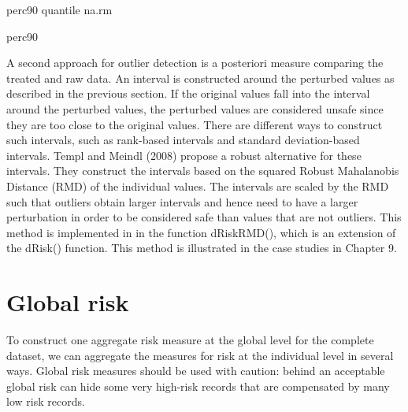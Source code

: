 \documentclass[letterpaper,10pt,english]{sphinxmanual}
\begin{document}
\def\sphinxLiteralBlockLabel{\label{\detokenize{measure_risk:code410}}}
%
\begin{sphinxVerbatim}[commandchars=\\\{\},numbers=left,firstnumber=1,stepnumber=1]
 perc90  quantile\PYG{p}{[}\PYG{p}{]}  na.rm  

 \PYG{p}{[}\PYG{p}{[} \PYG{p}{]}  perc90 \PYG{p}{]}
\end{sphinxVerbatim}

A second approach for outlier detection is a posteriori measure
comparing the treated and raw data. An interval is constructed around
the perturbed values as described in the previous section. If the
original values fall into the interval around the perturbed values, the
perturbed values are considered unsafe since they are too close to the
original values. There are different ways to construct such intervals,
such as rank-based intervals and standard deviation-based intervals.
Templ and Meindl (2008) propose a robust alternative for these
intervals. They construct the intervals based on the squared Robust
Mahalanobis Distance (RMD) of the individual values. The intervals are
scaled by the RMD such that outliers obtain larger intervals and hence
need to have a larger perturbation in order to be considered safe than
values that are not outliers. This method is implemented in 
in the function dRiskRMD(), which is an extension of the dRisk()
function. This method is illustrated in the case studies in Chapter 9.


\section{Global risk}
\label{\detokenize{measure_risk:global-risk}}
To construct one aggregate risk measure at the global level for the
complete dataset, we can aggregate the measures for risk at the
individual level in several ways. Global risk measures should be used
with caution: behind an acceptable global risk can hide some very
high-risk records that are compensated by many low risk records.
\end{document}
